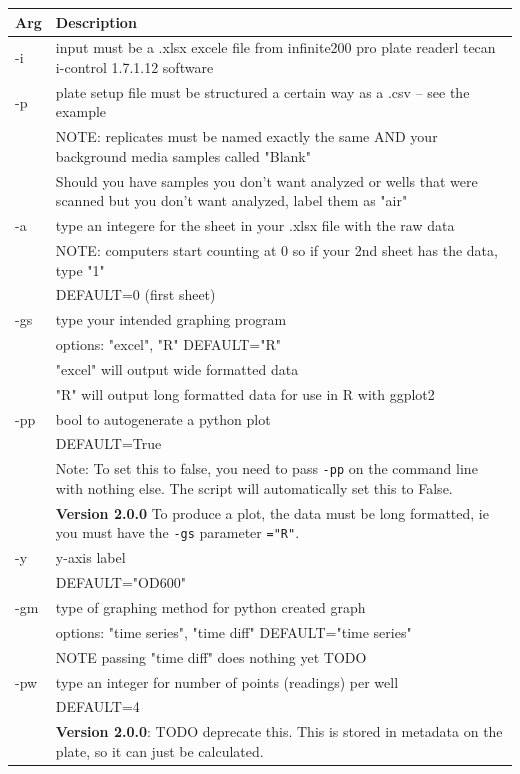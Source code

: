 \documentclass[12pt]{article}
\begin{document}
\begin{center}
\begin{xltabular}{\textwidth}{lX}
Arg & Description\\
\hline
-i & input must be a .xlsx excele file from infinite200 pro plate readerl tecan i-control 1.7.1.12 software\\
\hline
-p & plate setup file must be structured a certain way as a .csv -- see the example\\
 & NOTE: replicates must be named exactly the same AND your background media samples called "Blank"\\
 & Should you have samples you don't want analyzed or wells that were scanned but you don't want analyzed, label them as "air"\\
\hline
-a & type an integere for the sheet in your .xlsx file with the raw data\\
 & NOTE: computers start counting at 0 so if your 2nd sheet has the data, type "1"\\
 & DEFAULT=0 (first sheet)\\
\hline
-gs & type your intended graphing program\\
 & options: "excel", "R" DEFAULT="R"\\
 & "excel" will output wide formatted data\\
 & "R" will output long formatted data for use in R with ggplot2\\
\hline
-pp & bool to autogenerate a python plot\\
 & DEFAULT=True\\
 & Note: To set this to false, you need to pass \texttt{-pp} on the command line with nothing else. The script will automatically set this to False.\\
 & \textbf{Version 2.0.0} To produce a plot, the data must be long formatted, ie you must have the \texttt{-gs} parameter \texttt{="R"}.\\
\hline
-y & y-axis label\\
 & DEFAULT="OD600"\\
\hline
-gm & type of graphing method for python created graph\\
 & options: "time series", "time diff" DEFAULT="time series"\\
 & NOTE passing "time diff" does nothing yet TODO\\
\hline
-pw & type an integer for number of points (readings) per well\\
 & DEFAULT=4\\
 & \textbf{Version 2.0.0}: TODO deprecate this. This is stored in metadata on the plate, so it can just be calculated.\\

\end{xltabular}
\end{center}
\end{document}
